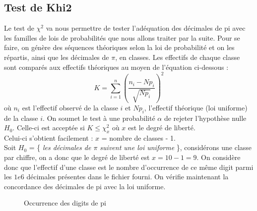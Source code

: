 \documentclass[10pt,a4paper]{article}
\begin{document}
\subsection{Test de Khi2}
Le test de $\chi^2$ va nous permettre de tester l'adéquation des décimales de pi avec les familles de lois de probabilités que nous allons traiter par la suite. Pour se faire, on génère des séquences théoriques selon la loi de probabilité et on les répartis, ainsi que les décimales de $\pi$, en classes. Les effectifs de chaque classe sont comparés aux effectifs théoriques au moyen de l'équation ci-dessous :
\[ K = \displaystyle\sum_{i=1}^n (\frac{n_i-Np_i}{\sqrt{Np_i}})^2\]
où $n_i$ est l'effectif observé de la classe $i$ et $Np_i$, l'effectif théorique (loi uniforme) de la classe $i$. On soumet le test à une probabilité $\alpha$ de rejeter l'hypothèse nulle $H_0$. Celle-ci est acceptée si $K \leq \chi_x^2$ où $x$ est le degré de liberté. \\Celui-ci s'obtient facilement : $x$ = nombre de classes - 1. \\

Soit $H_0$ = \{\textit{ les décimales de $\pi$ suivent une loi uniforme }\}, considérons une classe par chiffre, on a donc que le degré de liberté est $x = 10 - 1 = 9 $. On considère donc que l'effectif d'une classe est le nombre d'occurrence de ce même digit parmi les $1e6$ décimales présentes dans le fichier fourni. On vérifie maintenant la concordance des décimales de pi avec la loi uniforme.
\begin{figure}[h!]
\caption{Occurrence des digits de pi}
\label{khi2histo}
\end{figure}
\end{document}
